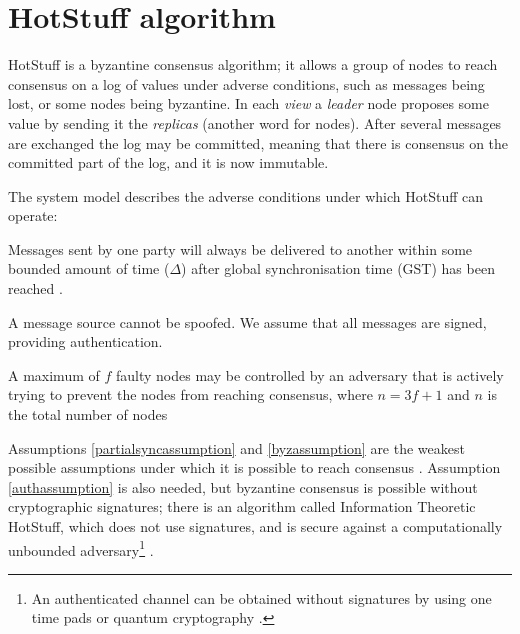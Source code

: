 \section{HotStuff algorithm} \label{hotstufftheory}
HotStuff is a byzantine consensus algorithm; it allows a group of nodes to reach consensus on a log of values under adverse conditions, such as messages being lost, or some nodes being byzantine. In each \textit{view} a \textit{leader} node proposes some value by sending it the \textit{replicas} (another word for nodes). After several messages are exchanged the log may be committed, meaning that there is consensus on the committed part of the log, and it is now immutable.

The system model describes the adverse conditions under which HotStuff can operate:
\begin{assumption} \label{partialsyncassumption}
	Messages sent by one party will always be delivered to another within some bounded amount of time ($\Delta$) after global synchronisation time (GST) has been reached \cite{dworkConsensusPresencePartial1988}.
\end{assumption}

\begin{assumption}[Authenticated] \label{authassumption}
	A message source cannot be spoofed. We assume that all messages are signed, providing authentication.
\end{assumption}

\begin{assumption}[Byzantine] \label{byzassumption}
	A maximum of $f$ faulty nodes may be controlled by an adversary that is actively trying to prevent the nodes from reaching consensus, where $n = 3f + 1$ and $n$ is the total number of nodes
\end{assumption}

Assumptions \ref{partialsyncassumption} and \ref{byzassumption} are the weakest possible assumptions under which it is possible to reach consensus \cite{peaseReachingAgreementPresence1980,fischerEasyImpossibilityProofs1986}. Assumption \ref{authassumption} is also needed, but byzantine consensus is possible without cryptographic signatures; there is an algorithm called Information Theoretic HotStuff, which does not use signatures, and is secure against a computationally unbounded adversary\footnote{An authenticated channel can be obtained without signatures by using one time pads or quantum cryptography \cite{bennettExperimentalQuantumCryptography1992}.} \cite{abrahamInformationTheoreticHotStuff2020}.

